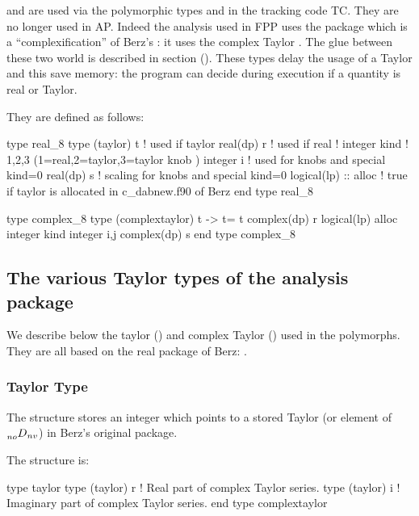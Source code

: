 \documentclass{hitec}     %
\begin{document}
{{{{{{{  and  are used  via the polymorphic types  and  in the tracking code TC. They are no longer used in AP. Indeed the analysis used in FPP uses the package  which is a ``complexification'' of Berz's : it uses the complex Taylor . The glue between these two world is described in section (). These types delay the usage of a Taylor and this save memory: the program can decide during execution if a quantity is real or Taylor.
 


 
 
 They are defined as follows:
 
 \begin{code}
type real_8
 type (taylor) t ! used if taylor
 real(dp) r ! used if real
!
 integer kind !  1,2,3 (1=real,2=taylor,3=taylor knob )
 integer i ! used for knobs and special kind=0
 real(dp) s ! scaling for knobs and special kind=0
 logical(lp) :: alloc ! true if taylor is allocated in c_dabnew.f90 of Berz  
end type real_8

  
type complex_8
 type (complextaylor) t    -> t= t%
 complex(dp) r
 logical(lp) alloc
 integer kind
 integer i,j
 complex(dp) s
end type complex_8
 \end{code}
 
 \subsection{The various Taylor types of the analysis package}
\label{s:taylorall}


We describe below the taylor () and complex Taylor () used in the polymorphs. They  are all based on the real package of Berz: .

\subsubsection{Taylor Type}
\label{s:taylor}

The  structure stores  an integer  which points to a stored Taylor (or element of $\prescript{}{no}{D}_{nv}$) in Berz's original package.

The structure is:
\begin{code}
type taylor
   type (taylor) r     ! Real part of complex Taylor series.
   type (taylor) i     ! Imaginary part of complex Taylor series.
end type complextaylor
\end{code}

}}}}}}}
\end{document}
